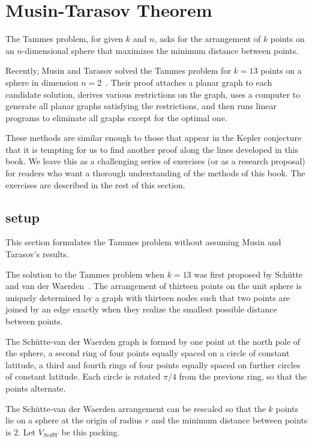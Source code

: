 \section{Musin-Tarasov Theorem}

The Tammes problem, for given $k$ and $n$, asks for the arrangement of
$k$ points on an $n$-dimensional sphere that maximizes the minimum
distance between points.

Recently, Musin and Tarasov solved the Tammes problem for $k=13$
points on a sphere in dimension $n=2$~\cite{Musin-Tarasov}.  Their
proof attaches a planar graph to each candidate solution, derives
various restrictions on the graph, uses a computer to generate all
planar graphs satisfying the restrictions, and then runs linear programs
to eliminate all graphs except for the optimal one.

These methods are similar enough to those that appear in the Kepler
conjecture that it is tempting for us to find another proof along the
lines developed in this book.  We leave this as a challenging series
of exercises (or as a research proposal) for readers who want a
thorough understanding of the methods of this book.  The exercises are
described in the rest of this section.

\subsection{setup}

This section formulates the Tammes problem without assuming 
 Musin and Tarasov's results.

 The solution to the Tammes problem when $k=13$ was first proposed by
 Sch\"utte and van der Waerden~\cite{vanderWaerden:1951}.  The
 arrangement of thirteen points on the unit sphere is uniquely
 determined by a graph with thirteen nodes such that two points are
 joined by an edge exactly when they realize the smallest possible
 distance between points.

The Sch\"utte-van der Waerden graph is formed by one point at the north
pole of the sphere, a second ring of four points equally spaced on a
circle of constant latitude, a third and fourth rings of four points
equally spaced on further circles of constant latitude.  Each circle
is rotated $\pi/4$ from the previous ring, so that the points
alternate.

The Sch\"utte-van der Waerden arrangement can be rescaled so that the
$k$ points lie on a sphere at the origin of radius $r$ and 
the minimum distance between points is $2$.  Let $V_{SvdW}$ be this
packing.


